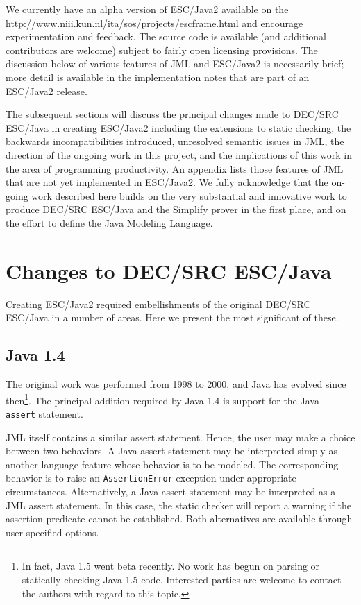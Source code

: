 \documentclass{sig-alternate}
\begin{document}
We currently have an alpha version of ESC/Java2 available on the
{http://www.niii.kun.nl/ita/sos/projects/escframe.html} and encourage
experimentation and feedback.  The source code is available
(and additional contributors are welcome) subject to fairly open
licensing provisions.  The discussion below of various features of JML
and ESC/Java2 is necessarily brief; more detail is available in the
implementation notes that are part of an ESC/Java2 release.

The subsequent sections will discuss the principal changes made to
DEC/SRC ESC/Java in creating ESC/Java2 including the extensions to
static checking, the backwards incompatibilities introduced,
unresolved semantic issues in JML, the direction of the ongoing work
in this project, and the implications of this work in the area of
programming productivity.  An appendix lists those features of JML
that are not yet implemented in ESC/Java2.  We fully acknowledge that
the on-going work described here builds on the very substantial and
innovative work to produce DEC/SRC ESC/Java and the Simplify prover in
the first place, and on the effort to define the Java Modeling
Language.


\section{Changes to DEC/SRC ESC/Java}

Creating ESC/Java2 required embellishments of the original DEC/SRC
ESC/Java in a number of areas.  Here we present the most significant
of these.
\subsection{Java 1.4}
The original work was performed from 1998 to 2000, and Java has evolved
since then\footnote{In fact, Java 1.5 went beta recently.  No work has begun on
  parsing or statically checking Java 1.5 code.  Interested parties
  are welcome to contact the authors with regard to this topic.}.  The
principal addition required by Java 1.4 is support for the Java {\tt
  assert} statement.  

JML itself contains a similar assert statement.  Hence, the user may make a choice between
two behaviors.  A Java assert statement may be interpreted simply as another language
feature whose behavior is to be modeled.  The corresponding behavior is to raise an
 \texttt{AssertionError} exception under appropriate circumstances.  Alternatively, 
a Java assert statement may be interpreted as a JML assert statement.  In this case, the
static checker will report a warning if the assertion predicate cannot be established.
Both alternatives are available through user-specified options.
\end{document}
